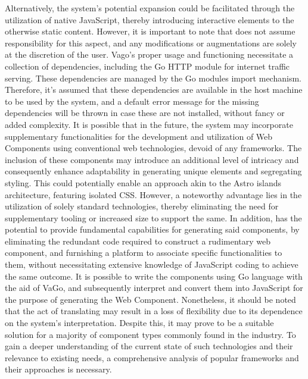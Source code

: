 {}Alternatively, the system's potential expansion could be facilitated through the utilization of native JavaScript, thereby introducing interactive elements to the otherwise static content. However, it is important to note that  does not assume responsibility for this aspect, and any modifications or augmentations are solely at the discretion of the user.\markdownRendererInterblockSeparator
{}Vago's proper usage and functioning necessitate a collection of dependencies, including the Go HTTP module for internet traffic serving. These dependencies are managed by the Go modules import mechanism. Therefore, it's assumed that these dependencies are available in the host machine to be used by the system, and a default error message for the missing dependencies will be thrown in case these are not installed, without fancy or added complexity.\markdownRendererInterblockSeparator
{}\markdownRendererInterblockSeparator
{}It is possible that in the future, the system may incorporate supplementary functionalities for the development and utilization of Web Components using conventional web technologies, devoid of any frameworks. The inclusion of these components may introduce an additional level of intricacy and consequently enhance adaptability in generating unique elements and segregating styling. This could potentially enable an approach akin to the Astro islands architecture, featuring isolated CSS. However, a noteworthy advantage lies in the utilization of solely standard technologies, thereby eliminating the need for supplementary tooling or increased size to support the same.\markdownRendererInterblockSeparator
{}In addition,  has the potential to provide fundamental capabilities for generating said components, by eliminating the redundant code required to construct a rudimentary web component, and furnishing a platform to associate specific functionalities to them, without necessitating extensive knowledge of JavaScript coding to achieve the same outcome. It is possible to write the components using Go language with the aid of VaGo, and subsequently interpret and convert them into JavaScript for the purpose of generating the Web Component.\markdownRendererInterblockSeparator
{}Nonetheless, it should be noted that the act of translating may result in a loss of flexibility due to its dependence on the system's interpretation. Despite this, it may prove to be a suitable solution for a majority of component types commonly found in the industry. To gain a deeper understanding of the current state of such technologies and their relevance to existing needs, a comprehensive analysis of popular frameworks and their approaches is necessary.\markdownRendererDocumentEnd